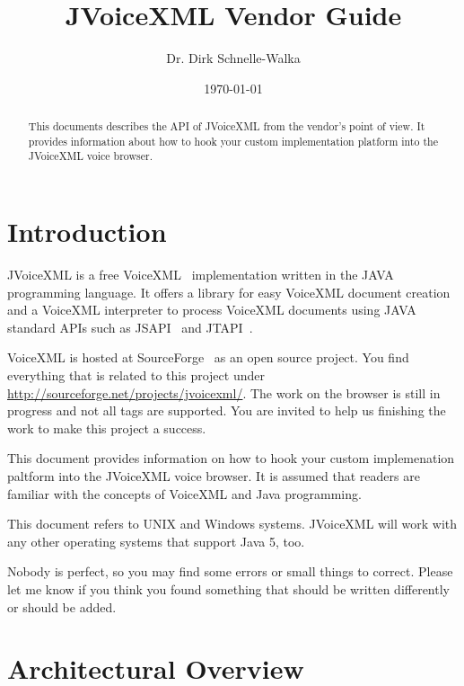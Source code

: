 \documentclass[11pt,a4paper]{article}
\title{JVoiceXML Vendor Guide}
\author{Dr. Dirk Schnelle-Walka}
\date{\today}
\begin{document}
\pagestyle{empty}

\maketitle

\pagestyle{headings}

\tableofcontents

\newpage

\begin{abstract}
This documents describes the API of JVoiceXML from the vendor's point of
view. It provides information about how to hook your custom implementation
platform into the JVoiceXML voice browser.
\end{abstract}


\section{Introduction}
\label{sec:introduction}

JVoiceXML is a free VoiceXML~\cite{w3.org:voicexml} implementation written in 
the JAVA programming language. It offers a library for easy VoiceXML
document creation and a VoiceXML interpreter to process 
VoiceXML documents using JAVA standard APIs such as JSAPI~\cite{sun:jsapi} and
JTAPI~\cite{sun:jsapi}.

VoiceXML is hosted at SourceForge~\cite{sourceforge} as an open source project.
You find everything that is related to this project under
\url{http://sourceforge.net/projects/jvoicexml/}.
The work on the browser is still in progress and not all tags are
supported. You are invited to help us finishing the work to make this
project a success.

This document provides information on how to hook your custom implemenation
paltform into the JVoiceXML voice browser. It is assumed that readers are
familiar with the concepts of VoiceXML and Java programming.

This document refers to UNIX and Windows systems. JVoiceXML will work with 
any other operating systems that support Java 5, too.

Nobody is perfect, so you may find some errors or small things to correct.
Please let me know if you think you found something that should be written
differently or should be added.

\section{Architectural Overview}
\label{sec:arch-overv}
\end{document}
